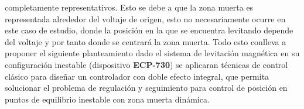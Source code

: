  completamente representativos. Esto se debe a que la zona muerta es representada alrededor del voltaje de origen, esto no necesariamente ocurre en este caso de estudio, donde la posición
 en la que se encuentra levitando depende del voltaje y por tanto donde se centrará la zona muerta. Todo esto conlleva a proponer el siguiente planteamiento dado
 el sistema de levitación magnética en su configuración inestable (dispositivo \textbf{ECP-730}) se aplicaran técnicas de control clásico para diseñar un controlador con doble efecto integral, que permita solucionar 
 el problema de regulación y seguimiento para control de posición en puntos de equilibrio inestable con zona muerta dinámica.

\newpage

